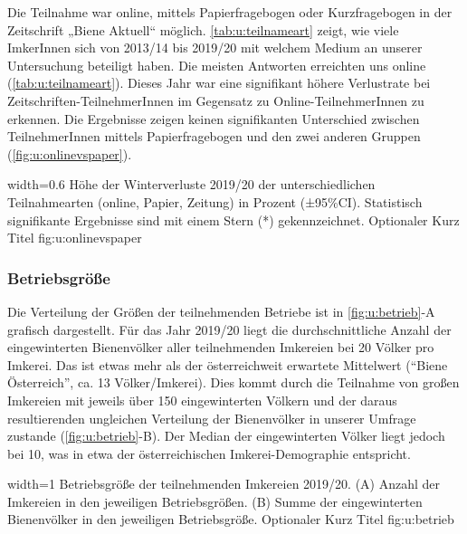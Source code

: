 Die Teilnahme war online, mittels Papierfragebogen oder Kurzfragebogen in der Zeitschrift „Biene Aktuell`` möglich. \cref{tab:u:teilnameart} zeigt, wie viele ImkerInnen sich von 2013/14 bis 2019/20 mit welchem Medium an unserer Untersuchung beteiligt haben. Die meisten Antworten erreichten uns online (\cref{tab:u:teilnameart}). Dieses Jahr war eine signifikant höhere Verlustrate bei Zeitschriften-TeilnehmerInnen  im Gegensatz zu Online-TeilnehmerInnen  zu erkennen. Die Ergebnisse zeigen keinen signifikanten Unterschied zwischen TeilnehmerInnen mittels Papierfragebogen  und den zwei anderen Gruppen (\cref{fig:u:onlinevspaper}).

  {width=0.6\textwidth} %
  {Höhe der Winterverluste 2019/20 der unterschiedlichen Teilnahmearten (online, Papier, Zeitung) in Prozent (±95\%CI). Statistisch signifikante Ergebnisse sind mit einem Stern (*) gekennzeichnet.} %
  {Optionaler Kurz Titel} %
  {fig:u:onlinevspaper} %



\newpage

\subsubsection{Betriebsgröße}

Die Verteilung der Größen der teilnehmenden Betriebe ist in \cref{fig:u:betrieb}-A grafisch dargestellt. Für das Jahr 2019/20 liegt die durchschnittliche Anzahl der eingewinterten Bienenvölker aller teilnehmenden Imkereien bei 20 Völker pro Imkerei. Das ist etwas mehr als der österreichweit erwartete Mittelwert (\enquote{Biene Österreich}, ca. 13 Völker/Imkerei). Dies kommt durch die Teilnahme von großen Imkereien mit jeweils über 150 eingewinterten Völkern und der daraus resultierenden ungleichen Verteilung der Bienenvölker in unserer Umfrage zustande (\cref{fig:u:betrieb}-B). Der Median der eingewinterten Völker liegt jedoch bei 10, was in etwa der österreichischen Imkerei-Demographie entspricht. 

  {width=1\textwidth} %
  {Betriebsgröße der teilnehmenden Imkereien 2019/20. (A) Anzahl der Imkereien in den jeweiligen Betriebsgrößen. (B) Summe der eingewinterten Bienenvölker in den jeweiligen Betriebsgröße.} %
  {Optionaler Kurz Titel} %
  {fig:u:betrieb} %

